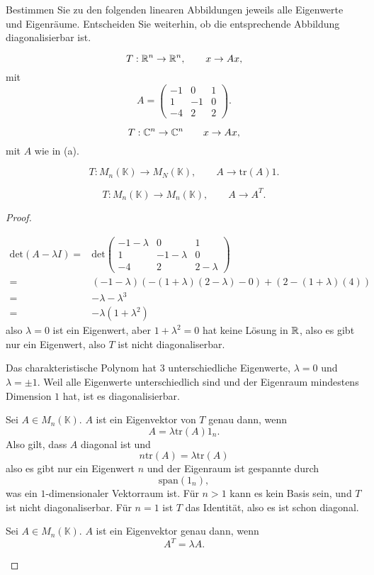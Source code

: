 \begin{Problem}
	Bestimmen Sie zu den folgenden linearen Abbildungen jeweils alle Eigenwerte und Eigenräume. Entscheiden Sie weiterhin, ob die entsprechende Abbildung diagonalisierbar ist.
	\begin{parts}
	\item 
		\[
		T:\mathbb{R}^n\to \mathbb{R}^n,\qquad x\to Ax,\] mit
		\[
			A=\begin{pmatrix} -1 & 0 & 1 \\ 1 & -1 & 0 \\ -4 & 2 & 2 \end{pmatrix} 
		.\] 
	\item 
		\[
		T:\mathbb{C}^n\to \mathbb{C}^n\qquad x\to Ax,\] mit $A$ wie in (a).
	\item 
		\[
			T:M_n(\mathbb{K})\to M_N(\mathbb{K}),\qquad A\to \text{tr}(A)1
		.\] 
	\item
		 \[
			 T: M_n(\mathbb{K})\to M_n(\mathbb{K}),\qquad A\to A^T
		.\] 
	\end{parts}
\end{Problem}

\begin{proof}
	\begin{parts}
	\item 
		\begin{align*}
			\text{det}(A-\lambda I)=&\text{det}\begin{pmatrix} -1-\lambda & 0 & 1 \\ 1 & -1-\lambda & 0 \\ -4 & 2 & 2-\lambda \end{pmatrix} \\
			=&(-1-\lambda)(-(1+\lambda)(2-\lambda)-0)+(2-(1+\lambda)(4))\\
			=&-\lambda-\lambda^3\\
			=&-\lambda(1+\lambda^2)
		\end{align*}
		also $\lambda=0$ ist ein Eigenwert, aber $1+\lambda^2=0$ hat keine Lösung in $\mathbb{R}$, also es gibt nur ein Eigenwert, also $T$ ist nicht diagonaliserbar.
	\item Das charakteristische Polynom hat $3$ unterschiedliche Eigenwerte, $\lambda=0$ und $\lambda=\pm 1$. Weil alle Eigenwerte unterschiedlich sind und der Eigenraum mindestens Dimension $1$ hat, ist es diagonalisierbar. 
	\item Sei $A\in M_n(\mathbb{K})$. $A$ ist ein Eigenvektor von $T$ genau dann, wenn
		\[
			A=\lambda\text{tr}(A)1_n
		.\] 
		Also gilt, dass $A$ diagonal ist und
		\[
			n\text{tr}(A)=\lambda\text{tr}(A)
	\]
	also es gibt nur ein Eigenwert $n$ und der Eigenraum ist gespannte durch
	\[
		\text{span}\left( 1_n \right) 
	,\] 
	was ein $1$-dimensionaler Vektorraum ist. F\"{u}r $n>1$ kann es kein Basis sein, und $T$ ist nicht diagonaliserbar. F\"{u}r $n=1$ ist $T$ das Identität, also es ist schon diagonal.
\item Sei $A\in M_n(\mathbb{K})$. $A$ ist ein Eigenvektor genau dann, wenn
	\[
	A^T=\lambda A
	.\] 
	\end{parts}
\end{proof}
